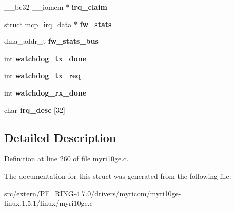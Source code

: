 \begin{DoxyCompactItemize}
\item 
\hypertarget{structmyri10ge__slice__state_a9c1be12240fec6f72ba9485d9eda6dff}{
\_\-\_\-be32 \_\-\_\-iomem $\ast$ {\bfseries irq\_\-claim}}
\label{structmyri10ge__slice__state_a9c1be12240fec6f72ba9485d9eda6dff}

\item 
\hypertarget{structmyri10ge__slice__state_a51615d9365348cb61222452291a7e769}{
struct \hyperlink{structmcp__irq__data}{mcp\_\-irq\_\-data} $\ast$ {\bfseries fw\_\-stats}}
\label{structmyri10ge__slice__state_a51615d9365348cb61222452291a7e769}

\item 
\hypertarget{structmyri10ge__slice__state_a4cfd92bf086dc44f14288c3c2736b8c5}{
dma\_\-addr\_\-t {\bfseries fw\_\-stats\_\-bus}}
\label{structmyri10ge__slice__state_a4cfd92bf086dc44f14288c3c2736b8c5}

\item 
\hypertarget{structmyri10ge__slice__state_a30693c12716cedb1e33cf709f81d9e88}{
int {\bfseries watchdog\_\-tx\_\-done}}
\label{structmyri10ge__slice__state_a30693c12716cedb1e33cf709f81d9e88}

\item 
\hypertarget{structmyri10ge__slice__state_a1ca38b79bb3325be83025a70bffc27f9}{
int {\bfseries watchdog\_\-tx\_\-req}}
\label{structmyri10ge__slice__state_a1ca38b79bb3325be83025a70bffc27f9}

\item 
\hypertarget{structmyri10ge__slice__state_aac049274d1b66d77c3a7526bb2747214}{
int {\bfseries watchdog\_\-rx\_\-done}}
\label{structmyri10ge__slice__state_aac049274d1b66d77c3a7526bb2747214}

\item 
\hypertarget{structmyri10ge__slice__state_a50d5512b57dce526381a85d13fcf8649}{
char {\bfseries irq\_\-desc} \mbox{[}32\mbox{]}}
\label{structmyri10ge__slice__state_a50d5512b57dce526381a85d13fcf8649}

\end{DoxyCompactItemize}


\subsection{Detailed Description}


Definition at line 260 of file myri10ge.c.



The documentation for this struct was generated from the following file:\begin{DoxyCompactItemize}
\item 
src/extern/PF\_\-RING-\/4.7.0/drivers/myricom/myri10ge-\/linux.1.5.1/linux/myri10ge.c\end{DoxyCompactItemize}
